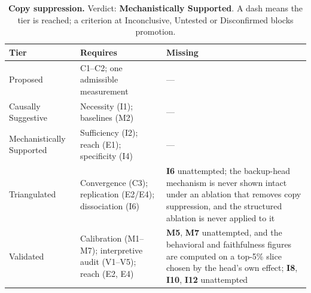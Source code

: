 \begin{table}[H]
\centering
\footnotesize
\caption{\textbf{Copy suppression.} Verdict: \textbf{Mechanistically Supported}. A dash means the tier is reached; a criterion at
Inconclusive, Untested or Disconfirmed blocks promotion.}
\label{tab:copy_suppression-verdict}
\renewcommand{\arraystretch}{1.18}
\begin{tabular}{@{}l>{\raggedright\arraybackslash}p{3.6cm}>{\raggedright\arraybackslash}p{4.4cm}@{}}
\toprule
\textbf{Tier} & \textbf{Requires} & \textbf{Missing} \\
\midrule
Proposed & C1--C2; one admissible measurement & --- \\
\addlinespace[2pt]
Causally Suggestive & Necessity (I1); baselines (M2) & --- \\
\addlinespace[2pt]
Mechanistically Supported & Sufficiency (I2); reach (E1); specificity (I4) & --- \\
\addlinespace[2pt]
Triangulated & Convergence (C3); replication (E2/E4); dissociation (I6) & \textbf{I6} unattempted; the backup-head mechanism is never shown intact under an ablation that removes copy suppression, and the structured ablation is never applied to it \\
\addlinespace[2pt]
Validated & Calibration (M1--M7); interpretive audit (V1--V5); reach (E2, E4) & \textbf{M5}, \textbf{M7} unattempted, and the behavioral and faithfulness figures are computed on a top-5\% slice chosen by the head's own effect; \textbf{I8}, \textbf{I10}, \textbf{I12} unattempted \\
\bottomrule
\end{tabular}
\end{table}
